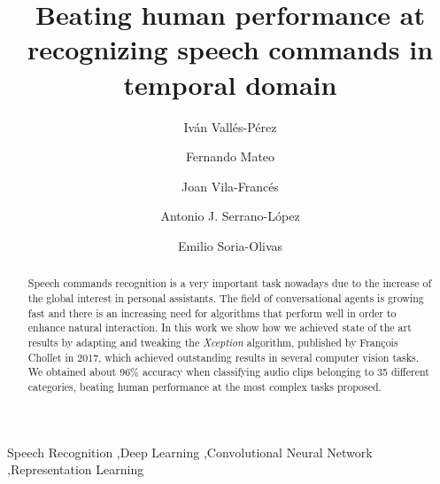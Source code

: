 \documentclass{elsarticle}
\begin{document}
\begin{frontmatter}

\title{Beating human performance at recognizing speech commands in temporal domain}

\author[UV]{Iván Vallés-Pérez}
\author[UV]{Fernando Mateo}
\author[UV]{Joan Vila-Francés}
\author[UV]{Antonio J. Serrano-López}
\author[UV]{Emilio Soria-Olivas}







\address[UV]{Escola Tècnica Superior d\textsc{}Enginyeria, University of Valencia, Avenida de la Universitat s/n 46100 Burjassot, Valencia, Spain}

\begin{abstract}
Speech commands recognition is a very important task nowadays due to the increase of the global interest in personal assistants. The field of conversational agents is growing fast and there is an increasing need for algorithms that perform well in order to enhance natural interaction. In this work we show how we achieved state of the art results by adapting and tweaking the \textit{Xception} algorithm, published by François Chollet in 2017, which achieved outstanding results in several computer vision tasks. We obtained about 96\% accuracy when classifying audio clips belonging to 35 different categories, beating human performance at the most complex tasks proposed.
\end{abstract}

\begin{keyword}
Speech Recognition \sep Deep Learning \sep Convolutional Neural Network \sep Representation Learning
\end{keyword}

\end{frontmatter}
\end{document}
